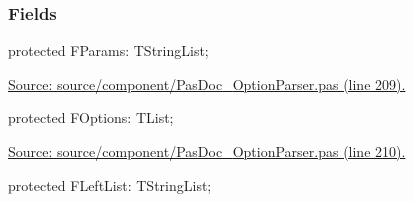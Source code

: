 \documentclass{report}
\newif\ifpdf
\begin{document}
\subsubsection*{\large{\textbf{Fields}}\normalsize\hspace{1ex}\hfill}
\begin{list}{}{
\setlength{\itemindent}{0cm}
\setlength{\listparindent}{0cm}
\setlength{\leftmargin}{\evensidemargin}
\addtolength{\leftmargin}{\tmplength}
\settowidth{\labelsep}{X}
\addtolength{\leftmargin}{\labelsep}
\setlength{\labelwidth}{\tmplength}
}
\label{PasDoc_OptionParser.TOptionParser-FParams}
\item[\textbf{FParams}\hfill]
\ifpdf
\begin{flushleft}
\fi
\begin{ttfamily}
protected FParams: TStringList;\end{ttfamily}

\ifpdf
\end{flushleft}
\fi


\par  \par
\href{https://github.com/pasdoc/pasdoc/blob/master/source/component/PasDoc_OptionParser.pas#L209}{Source: source/component/PasDoc{\_}OptionParser.pas (line 209).}\label{PasDoc_OptionParser.TOptionParser-FOptions}
\item[\textbf{FOptions}\hfill]
\ifpdf
\begin{flushleft}
\fi
\begin{ttfamily}
protected FOptions: TList;\end{ttfamily}

\ifpdf
\end{flushleft}
\fi


\par  \par
\href{https://github.com/pasdoc/pasdoc/blob/master/source/component/PasDoc_OptionParser.pas#L210}{Source: source/component/PasDoc{\_}OptionParser.pas (line 210).}\label{PasDoc_OptionParser.TOptionParser-FLeftList}
\item[\textbf{FLeftList}\hfill]
\ifpdf
\begin{flushleft}
\fi
\begin{ttfamily}
protected FLeftList: TStringList;\end{ttfamily}

\ifpdf
\end{flushleft}
\fi



\end{list}
\end{document}
